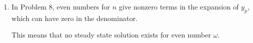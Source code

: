 \begin{enumerate}
\begin{align}
              \frac{\cos(n\pi/2)}{1 - n^2} & = (-n^2 + \omega^2)A_n            \\
              0                            & = (-n^2 + \omega^2)B_n            \\
              y_p                          & = \color{y_p} \frac{1}{2\omega^2}
              + \iser[n]{2} \frac{\cos(n\pi/2)}{(1 - n^2)(\omega^2 - n^2)}
              \ \cos(nt)
          \end{align}
          Finding the general solution, by solving the h-ODE,
          \begin{align}
              y'' + \omega^2 y & = 0                                                   \\
              y_h              & = \color{y_h} C_1 \cos(\omega t) + C_2 \sin(\omega t) \\
              y                & = {\color{y_h} y_h} + {\color{y_p} y_p}
          \end{align}

    \item In Problem $ 8 $, even numbers for $ n $ give nonzero terms in the
          expansion of $ y_p $, which can have zero in the denominator. \par
          This means that no steady state solution exists for even number $ \omega $.


\end{enumerate}
